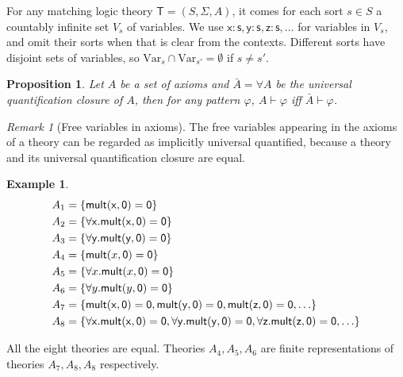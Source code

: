 \documentclass[UTF8]{article}
\newcounter{thmcounter}
\theoremstyle{plain}
\newtheorem{proposition}[thmcounter]{Proposition}
\theoremstyle{definition}
\newtheorem{example}[thmcounter]{Example}
\theoremstyle{remark}
\newtheorem{remark}[thmcounter]{Remark}
\begin{document}
For any matching logic theory $\mathsf{T} = (S, \Sigma, A)$, it comes for each sort $s \in S$ a countably infinite set $V_s$ of variables. We use $\mathsf{x:s}, \mathsf{y:s}, \mathsf{z:s}, \dots$ for variables in $V_s$, and omit their sorts when that is clear from the contexts. Different sorts have disjoint sets of variables, so $\mathrm{Var}_s \cap \mathrm{Var}_{s'} = \emptyset$ if $s \neq s'$.



\begin{proposition}
\label{prop:explicitly_universal_quantified_justification}
Let $A$ be a set of axioms and $\bar{A} = \forall A$ be the universal quantification closure of $A$, then for any pattern $\varphi$, $A \vdash \varphi$ iff $\bar{A} \vdash \varphi$.
\end{proposition}

\begin{remark}[Free variables in axioms]
\label{rmk:free_variables_in_axioms_are_universal_quantified}
The free variables appearing in the axioms of a theory can be regarded as implicitly universal quantified, because a theory and its universal quantification closure are equal.
\end{remark}

\begin{example}
  \begin{align*}
  A_1 &= \{{\sf mult(x, 0) = 0}\} \\
  A_2 &= \{{\sf \forall x . mult(x, 0) = 0}\} \\
  A_3 &= \{{\sf \forall y . mult(y, 0) = 0}\} \\
  A_4 &= \{\mathsf{mult}(x, \mathsf{0}) = \mathsf{0}\} \\
  A_5 &= \{\forall x . \mathsf{mult}(x, \mathsf{0}) = \mathsf{0}\} \\
  A_6 &= \{\forall y . \mathsf{mult}(y, \mathsf{0}) = \mathsf{0}\} \\
  A_7 &= \{{\sf mult(x, 0) = 0, mult(y, 0) = 0, mult(z, 0) = 0, \dots}\} \\
  A_8 &= \{{\sf \forall x . mult(x, 0) = 0, \forall y . mult(y, 0) = 0, \forall z . mult(z, 0) = 0, \dots}\}
  \end{align*}
  
  All the eight theories are equal. Theories $A_4, A_5, A_6$ are finite representations of theories $A_7, A_8, A_8$ respectively. 
\end{example}
\end{document}
